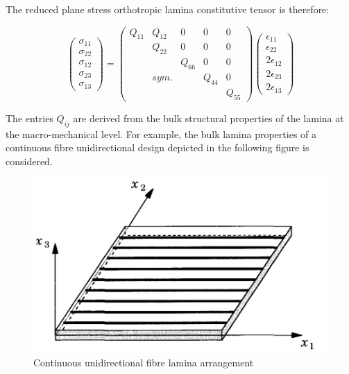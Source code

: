 The reduced plane stress orthotropic lamina constitutive tensor is therefore:

\begin{equation} 
\begin{pmatrix}
\sigma_{11} \\
\sigma_{22} \\
\sigma_{12} \\
\sigma_{23} \\
\sigma_{13} 
\end{pmatrix}
=
\begin{pmatrix}
Q_{11} & Q_{12} &  0 & 0 & 0 \\
\  & Q_{22} &  0 & 0 & 0 \\
\  & \  & Q_{66}  & 0 & 0 \\
\  & sym. & \  & Q_{44} & 0 \\
\  & \  & \  & \ & Q_{55}
\end{pmatrix}
\begin{pmatrix}
\epsilon_{11} \\
\epsilon_{22} \\
2\epsilon_{12}\\
2\epsilon_{23} \\
2\epsilon_{13}
\end{pmatrix}
\label{eqscomp_plane_stress_tensor_unrotated}
\end{equation}

The entries $Q_{ij}$ are derived from the bulk structural properties of the lamina at the macro-mechanical level. For example, the bulk lamina properties of a continuous fibre unidirectional design depicted in the following figure is considered.

\begin{figure}[H]
	\centering
	\includegraphics[width=12cm]{images/composite_unidirectional_lamina}
	\caption{Continuous unidirectional fibre lamina arrangement \cite{reddy2004mechanics}}
	\label{fig:compositeunidirectionallamina}
\end{figure}


